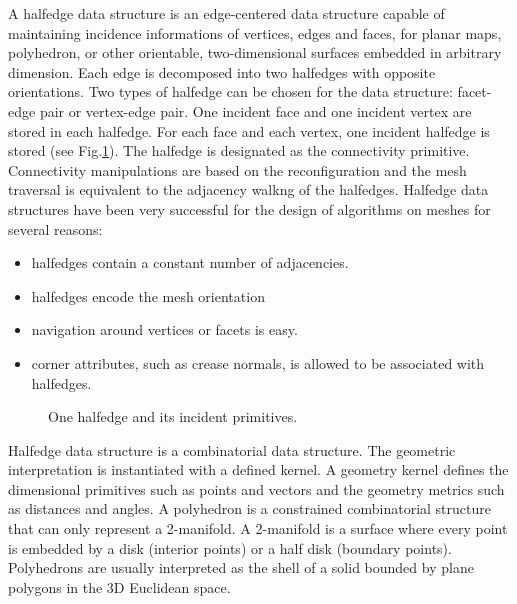A halfedge data structure \cite{hds} 
is an edge-centered data structure
capable of maintaining incidence informations of vertices, edges and
faces, for planar maps, polyhedron, or other orientable,
two-dimensional surfaces embedded in arbitrary dimension. Each edge is
decomposed into two halfedges with opposite orientations. 
Two types of halfedge can be chosen for the data structure:
facet-edge pair or vertex-edge pair. 
One incident face and one incident vertex 
are stored in each halfedge. For each
face and each vertex, one incident halfedge is stored (see
Fig.\ref{fig:halfedge}). The halfedge is designated as the
connectivity primitive. Connectivity manipulations are based
on the reconfiguration and the mesh traversal is equivalent
to the adjacency walkng of the halfedges. 
Halfedge data structures have been very successful for the design of
algorithms on meshes for several reasons:
\begin{itemize}
\item halfedges contain a constant number of adjacencies. 
\item halfedges encode the mesh orientation
\item navigation around vertices or facets is easy.
\item corner attributes, such as crease normals, is allowed 
to be associated with halfedges.
\end{itemize}

\begin{figure}[htb]
    \caption{One halfedge and its incident primitives.}
    \label{fig:halfedge}
\end{figure}

Halfedge data structure is a combinatorial data structure. 
The geometric interpretation is instantiated with a defined
kernel. A geometry kernel defines the dimensional primitives
such as points and vectors and the geometry metrics such
as distances and angles. A polyhedron is a constrained 
combinatorial structure that can only represent 
a 2-manifold. A 2-manifold is a surface where every 
point is embedded by a disk (interior points) or 
a half disk (boundary points). Polyhedrons are usually
interpreted as the shell of a solid bounded by plane
polygons in the 3D Euclidean space.

